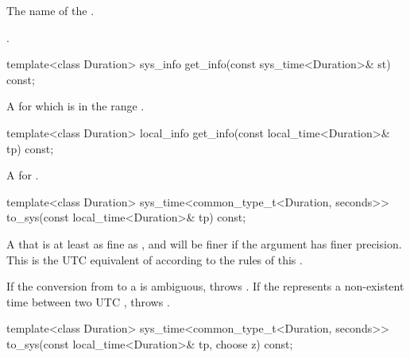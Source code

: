 \begin{itemdescr}
\pnum
\returns
The name of the .

\pnum
\begin{example}
.
\end{example}
\end{itemdescr}

%
\begin{itemdecl}
template<class Duration>
  sys_info get_info(const sys_time<Duration>& st) const;
\end{itemdecl}

\begin{itemdescr}
\pnum
\returns
A   for which
 is in the range .
\end{itemdescr}

%
\begin{itemdecl}
template<class Duration>
  local_info get_info(const local_time<Duration>& tp) const;
\end{itemdecl}

\begin{itemdescr}
\pnum
\returns
A  for .
\end{itemdescr}

%
\begin{itemdecl}
template<class Duration>
  sys_time<common_type_t<Duration, seconds>>
    to_sys(const local_time<Duration>& tp) const;
\end{itemdecl}

\begin{itemdescr}
\pnum
\returns
A  that is at least as fine as ,
and will be finer if the argument  has finer precision.
This  is the UTC equivalent of 
according to the rules of this .

\pnum
\throws
If the conversion from  to a  is ambiguous,
throws .
If the  represents a non-existent time between two UTC ,
throws .
\end{itemdescr}

%
\begin{itemdecl}
template<class Duration>
  sys_time<common_type_t<Duration, seconds>>
    to_sys(const local_time<Duration>& tp, choose z) const;
\end{itemdecl}

